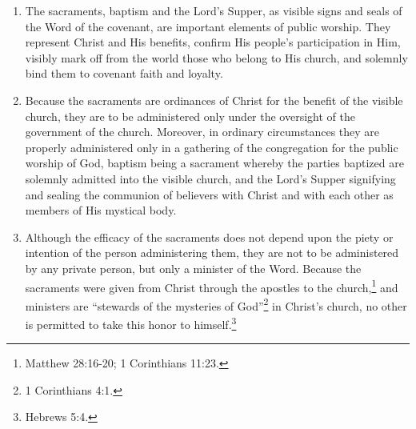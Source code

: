 \documentclass[
]{book}
\providecommand{\tightlist}{%
  \setlength{\itemsep}{0pt}\setlength{\parskip}{0pt}}
\begin{document}
\begin{enumerate}
  \begin{enumerate}
  \def\labelenumii{\alph{enumii}.}
  \tightlist
  \item
    The sacraments, baptism and the Lord's Supper, as visible signs and seals of the Word of the covenant, are important elements of public worship. They represent Christ and His benefits, confirm His people's participation in Him, visibly mark off from the world those who belong to His church, and solemnly bind them to covenant faith and loyalty.
  \item
    Because the sacraments are ordinances of Christ for the benefit of the visible church, they are to be administered only under the oversight of the government of the church. Moreover, in ordinary circumstances they are properly administered only in a gathering of the congregation for the public worship of God, baptism being a sacrament whereby the parties baptized are solemnly admitted into the visible church, and the Lord's Supper signifying and sealing the communion of believers with Christ and with each other as members of His mystical body.
  \item
    Although the efficacy of the sacraments does not depend upon the piety or intention of the person administering them, they are not to be administered by any private person, but only a minister of the Word. Because the sacraments were given from Christ through the apostles to the church,\footnote{Matthew 28:16-20; 1 Corinthians 11:23.} and ministers are ``stewards of the mysteries of God''\footnote{1 Corinthians 4:1.} in Christ's church, no other is permitted to take this honor to himself.\footnote{Hebrews 5:4.}
  \end{enumerate}
\end{enumerate}
\end{document}
